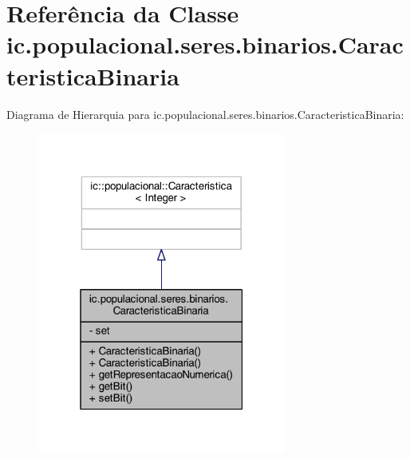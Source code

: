 \hypertarget{classic_1_1populacional_1_1seres_1_1binarios_1_1_caracteristica_binaria}{\section{Referência da Classe ic.\-populacional.\-seres.\-binarios.\-Caracteristica\-Binaria}
\label{classic_1_1populacional_1_1seres_1_1binarios_1_1_caracteristica_binaria}
}


Diagrama de Hierarquia para ic.\-populacional.\-seres.\-binarios.\-Caracteristica\-Binaria\-:
\nopagebreak
\begin{figure}[H]
\begin{center}
\leavevmode
\includegraphics[width=232pt]{classic_1_1populacional_1_1seres_1_1binarios_1_1_caracteristica_binaria__inherit__graph}
\end{center}
\end{figure}


